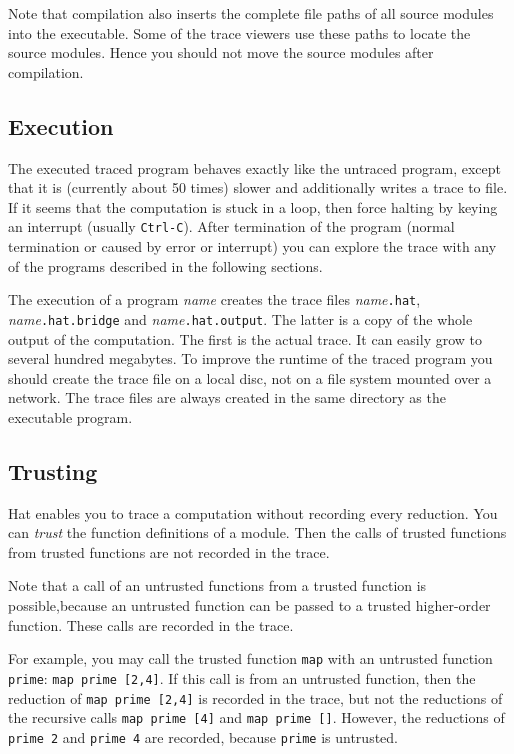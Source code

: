\documentclass[12pt]{article}
\begin{document}
Note that compilation also inserts the complete file paths of all source modules into the executable. Some of the trace viewers use these paths to locate the source modules. Hence you should not move the source modules after compilation.


\subsection{Execution}

The executed traced program behaves exactly like the untraced program, except that it is (currently about 50 times) slower and additionally writes a trace to file. 
If it seems that the computation is stuck in a loop, then
force halting by keying an interrupt
(usually \texttt{Ctrl-C}).
After termination of the program (normal termination or caused by error or interrupt) you can explore the trace with any of the programs described in the following sections.

The execution of a program \emph{name} creates the trace files \emph{name}\texttt{.hat}, \emph{name}\texttt{.hat.bridge} and \emph{name}\texttt{.hat.output}. The latter is a copy of the whole output of the computation. The first is the actual trace. It can easily grow to several hundred megabytes. To improve the runtime of the traced program you should create the trace file on a local disc, not on a file system mounted over a network. The trace files are always created in the same directory as the executable program.


\subsection{Trusting}

Hat enables you to trace a computation without recording every reduction. 
You can \emph{trust} the function definitions of a module. Then the calls of trusted functions from trusted functions are not recorded in the trace.

Note that a call of an untrusted functions from a trusted function is possible,because an untrusted function can be passed to a trusted higher-order function. These calls are recorded in the trace.

For example, you may call the trusted function \texttt{map} with an untrusted function \texttt{prime}: \texttt{map prime [2,4]}. If this call is from an untrusted function, then the reduction of \texttt{map prime [2,4]} is recorded in the trace, but not the reductions of the recursive calls \texttt{map prime [4]} and \texttt{map prime []}. However, the reductions of \texttt{prime 2} and \texttt{prime 4} are recorded, because \texttt{prime} is untrusted.
\end{document}
